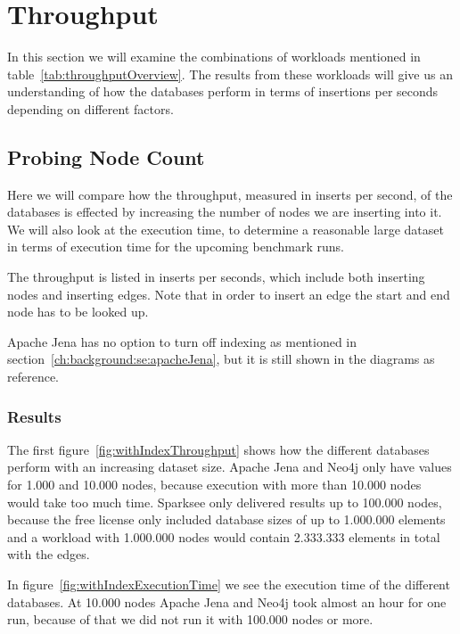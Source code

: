 \section{Throughput}
\label{ch:evaluation:se:throughput}

In this section we will examine the combinations of workloads mentioned in table~\ref{tab:throughputOverview}.
The results from these workloads will give us an understanding of how the databases perform in terms of insertions per seconds depending on different factors.


\subsection{Probing Node Count}
\label{ch:evaluation:se:probingNodeCount}
Here we will compare how the throughput,
measured in inserts per second,
of the databases is effected by increasing the number of nodes we are inserting into it.
We will also look at the execution time,
to determine a reasonable large dataset in terms of execution time for the upcoming benchmark runs.

The throughput is listed in inserts per seconds,
which include both inserting nodes and inserting edges.
Note that in order to insert an edge the start and end node has to be looked up.

Apache Jena has no option to turn off indexing as mentioned in section~\ref{ch:background:se:apacheJena},
but it is still shown in the diagrams as reference.

\subsubsection{Results}
The first figure~\ref{fig:withIndexThroughput} shows how the different databases perform with an increasing dataset size.
Apache Jena and Neo4j only have values for 1.000 and 10.000 nodes,
because execution with more than 10.000 nodes would take too much time.
Sparksee only delivered results up to 100.000 nodes,
because the free license only included database sizes of up to 1.000.000 elements and a workload with 1.000.000 nodes would contain 2.333.333 elements in total with the edges.

In figure~\ref{fig:withIndexExecutionTime} we see the execution time of the different databases.
At 10.000 nodes Apache Jena and Neo4j took almost an hour for one run,
because of that we did not run it with 100.000 nodes or more.

